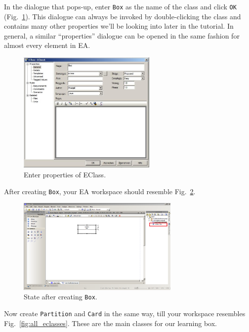 \clearpage

In the dialogue that pops-up, enter \texttt{Box} as the name of the class and
click \texttt{OK} (Fig.~\ref{fig:eclass_properties}).  This dialogue can
always be invoked by double-clicking the class and contains many other
properties we'll be looking into later in the tutorial.  In general, a similar
``properties'' dialogue can be opened in the same fashion for almost every
element in EA.

\begin{figure}[htbp]
	\centering
  \includegraphics[width=0.6\textwidth]{pics/memBoxBilder/memBox08.png}
	\caption{Enter properties of EClass.}
	\label{fig:eclass_properties}
\end{figure}

After creating \texttt{Box}, your EA workspace should resemble
Fig.~\ref{fig:eclass_completed}. 

\begin{figure}[htbp]
	\centering
  \includegraphics[width=0.7\textwidth]{pics/memBoxBilder/memBox09.png}
	\caption{State after creating \texttt{Box}.}
	\label{fig:eclass_completed}
\end{figure}

\clearpage

Now create \texttt{Partition} and \texttt{Card} in the same way, till your
workspace resembles Fig.~\ref{fig:all_eclasses}.  These are the main classes for
our learning box.

